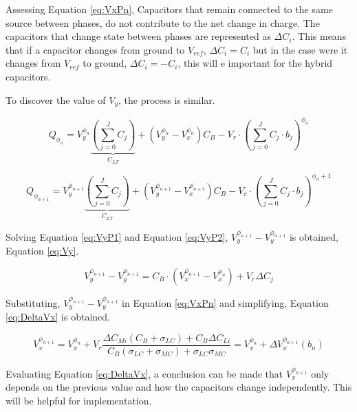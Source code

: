 Assessing Equation \ref{eq:VxPn}, Capacitors that remain connected to the same source between phases, do not contribute to the net change in charge. The capacitors that change state between phases are represented as $\Delta C_i$. This means that if a capacitor changes from ground to $V_{ref}$, $\Delta C_i = C_i$ but in the case were it changes from $V_{ref}$ to ground,  $\Delta C_i = -C_i$, this will e important for the hybrid capacitors.

To discover the value of $V_y$, the process is similar. 

\begin{equation}
    Q_{\phi_{n}} = V_y^{\phi_n}\underbrace{\left( \sum_{j=0}^{J}C_j \right)}_{C_{LT}} + (V_y^{\phi_{n}}-V_x^{\phi_{n}})C_B-V_r\cdot \left ( \sum_{j=0}^{J} C_j\cdot b_j \right )^{\phi_n}
    \label{eq:VyP1}
\end{equation}

\begin{equation}
    Q_{\phi_{n+1}} = V_y^{\phi_{n+1}}\underbrace{\left( \sum_{j=0}^{J}C_j \right)}_{C_{LT}} + (V_y^{\phi_{n+1}}-V_x^{\phi_{n+1}})C_B-V_r\cdot \left ( \sum_{j=0}^{J} C_j\cdot b_j \right )^{\phi_n+1}
    \label{eq:VyP2}
\end{equation}

Solving Equation \ref{eq:VyP1} and Equation \ref{eq:VyP2}, $V_y^{\phi_{n+1}}-V_y^{\phi_{n+1}}$ is obtained, Equation \ref{eq:Vy}.

\begin{equation}
    V_y^{\phi_{n+1}}-V_y^{\phi_{n+1}} = C_B\cdot (V_x^{\phi_{n+1}}-V_x^{\phi_n}) + V_r\Delta C_j
    \label{eq:Vy}
\end{equation}

Substituting, $V_y^{\phi_{n+1}}-V_y^{\phi_{n+1}}$ in Equation \ref{eq:VxPn} and simplifying, Equation \ref{eq:DeltaVx} is obtained.

\begin{equation}
    \boxed{V_{x}^{\phi_{n+1}}=V_{x}^{\phi_n}+V_{r}\frac{   {\Delta}C_{Mi} (C_{B} + \sigma_{LC} )+C_{B} {\Delta}C_{Li}}{C_{B}\left( \sigma_{LC} + \sigma_{MC}\right) + \sigma_{LC} \sigma_{MC}} = V_x^{\phi_n} + \Delta V_x^{\phi_{n+1}} (b_n)}
    \label{eq:DeltaVx}
\end{equation}

Evaluating Equation \ref{eq:DeltaVx}, a conclusion can be made that $V_x^{\phi_{n+1}}$ only depends on the previous value and how the capacitors change independently. This will be helpful for implementation. 